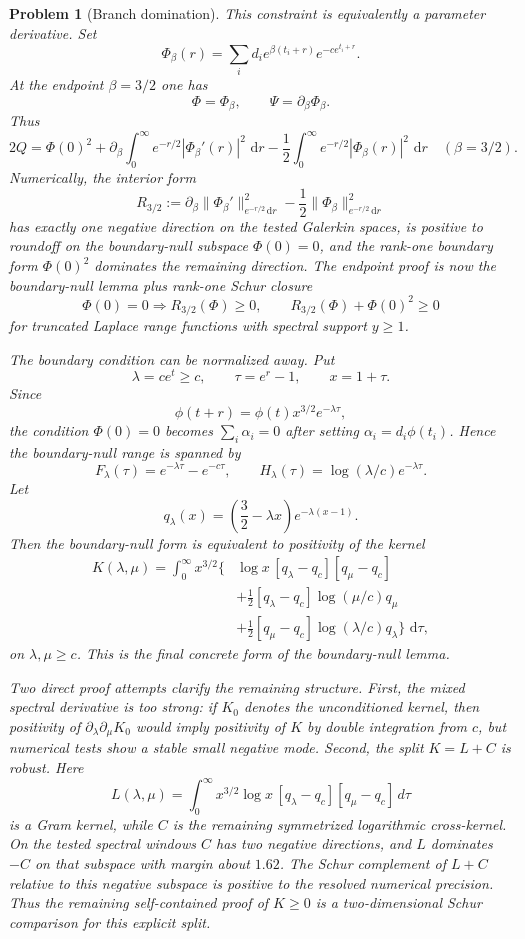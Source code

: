 \documentclass[11pt]{article}
\newtheorem{problem}[theorem]{Problem}
\newcommand{\dd}{\,\mathrm d}
\begin{document}
\begin{problem}[Branch domination]
This constraint is equivalently a parameter derivative.  Set
\[
  \Phi_\beta(r)=\sum_i d_i e^{\beta(t_i+r)}e^{-ce^{t_i+r}}.
\]
At the endpoint $\beta=3/2$ one has
\[
  \Phi=\Phi_\beta,\qquad \Psi=\partial_\beta\Phi_\beta .
\]
Thus
\[
  2Q=
  \Phi(0)^2+
  \partial_\beta\int_0^\infty e^{-r/2}|\Phi_\beta'(r)|^2\,\dd r
  -\frac12\int_0^\infty e^{-r/2}|\Phi_\beta(r)|^2\,\dd r
  \quad(\beta=3/2).
\]
Numerically, the interior form
\[
  R_{3/2}:=
  \partial_\beta\|\Phi_\beta'\|_{e^{-r/2}\dd r}^2
  -\frac12\|\Phi_\beta\|_{e^{-r/2}\dd r}^2
\]
has exactly one negative direction on the tested Galerkin spaces, is positive
to roundoff on the boundary-null subspace $\Phi(0)=0$, and the rank-one
boundary form $\Phi(0)^2$ dominates the remaining direction.  The endpoint
proof is now the boundary-null lemma plus rank-one Schur closure
\[
  \Phi(0)=0\Rightarrow R_{3/2}(\Phi)\ge0,\qquad
  R_{3/2}(\Phi)+\Phi(0)^2\ge0
\]
for truncated Laplace range functions with spectral support $y\ge1$.

The boundary condition can be normalized away.  Put
\[
  \lambda=ce^t\ge c,\qquad \tau=e^r-1,\qquad x=1+\tau.
\]
Since
\[
  \phi(t+r)=\phi(t)x^{3/2}e^{-\lambda\tau},
\]
the condition $\Phi(0)=0$ becomes $\sum_i\alpha_i=0$ after setting
$\alpha_i=d_i\phi(t_i)$.  Hence the boundary-null range is spanned by
\[
  F_\lambda(\tau)=e^{-\lambda\tau}-e^{-c\tau},\qquad
  H_\lambda(\tau)=\log(\lambda/c)e^{-\lambda\tau}.
\]
Let
\[
  q_\lambda(x)=\left(\frac32-\lambda x\right)e^{-\lambda(x-1)}.
\]
Then the boundary-null form is equivalent to positivity of the kernel
\[
\begin{aligned}
K(\lambda,\mu)=\int_0^\infty x^{3/2}\{&
\log x\,[q_\lambda-q_c][q_\mu-q_c]\\
&+\frac12[q_\lambda-q_c]\log(\mu/c)q_\mu\\
&+\frac12[q_\mu-q_c]\log(\lambda/c)q_\lambda\}\,\dd\tau ,
\end{aligned}
\]
on $\lambda,\mu\ge c$.  This is the final concrete form of the boundary-null
lemma.

Two direct proof attempts clarify the remaining structure.  First, the mixed
spectral derivative is too strong: if $K_0$ denotes the unconditioned kernel,
then positivity of $\partial_\lambda\partial_\mu K_0$ would imply positivity of
$K$ by double integration from $c$, but numerical tests show a stable small
negative mode.  Second, the split $K=L+C$ is robust.  Here
\[
  L(\lambda,\mu)=
  \int_0^\infty x^{3/2}\log x\,[q_\lambda-q_c][q_\mu-q_c]\,d\tau
\]
is a Gram kernel, while $C$ is the remaining symmetrized logarithmic
cross-kernel.  On the tested spectral windows $C$ has two negative directions,
and $L$ dominates $-C$ on that subspace with margin about $1.62$.  The Schur
complement of $L+C$ relative to this negative subspace is positive to the
resolved numerical precision.  Thus the remaining self-contained proof of
$K\ge0$ is a two-dimensional Schur comparison for this explicit split.


\end{problem}
\end{document}
